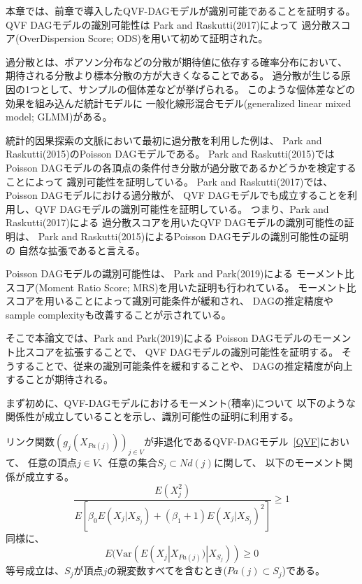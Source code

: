 

本章では、前章で導入したQVF-DAGモデル\cite{Park2017-hw}が識別可能であることを証明する。
QVF DAGモデルの識別可能性は
Park and Raskutti(2017)\cite{Park2017-hw}によって
過分散スコア(OverDispersion Score; ODS)を用いて初めて証明された。

過分散とは、ポアソン分布などの分散が期待値に依存する確率分布において、
期待される分散より標本分散の方が大きくなることである。
過分散が生じる原因の1つとして、サンプルの個体差などが挙げられる。
このような個体差などの効果を組み込んだ統計モデルに
一般化線形混合モデル(generalized linear mixed model; GLMM)がある\cite{2012-iq}。

統計的因果探索の文脈において最初に過分散を利用した例は、
Park and Raskutti(2015)\cite{Park2015-tj}のPoisson DAGモデルである。
Park and Raskutti(2015)\cite{Park2015-tj}では
Poisson DAGモデルの各頂点の条件付き分散が過分散であるかどうかを検定することによって
識別可能性を証明している。
Park and Raskutti(2017)\cite{Park2017-hw}では、
Poisson DAGモデルにおける過分散が、
QVF DAGモデルでも成立することを利用し、QVF DAGモデルの識別可能性を証明している。
つまり、Park and Raskutti(2017)\cite{Park2017-hw}による
過分散スコアを用いたQVF DAGモデルの識別可能性の証明は、
Park and Raskutti(2015)\cite{Park2015-tj}によるPoisson DAGモデルの識別可能性の証明の
自然な拡張であると言える。

Poisson DAGモデルの識別可能性は、
Park and Park(2019)\cite{Park2019-qy}による
モーメント比スコア(Moment Ratio Score; MRS)を用いた証明も行われている。
モーメント比スコアを用いることによって識別可能条件が緩和され、
DAGの推定精度やsample complexityも改善することが示されている\cite{Park2019-qy}。

そこで本論文では、Park and Park(2019)\cite{Park2019-qy}による
Poisson DAGモデルのモーメント比スコアを拡張することで、
QVF DAGモデルの識別可能性を証明する。
そうすることで、従来の識別可能条件\cite{Park2017-hw}を緩和することや、
DAGの推定精度が向上することが期待される。

まず初めに、QVF-DAGモデルにおけるモーメント(積率)について
以下のような関係性が成立していることを示し、識別可能性の証明に利用する。

\begin{prop} \label{prop:MRS}
  リンク関数$(g_j(X_{Pa(j)}))_{j \in V}$が非退化であるQVF-DAGモデル~\eqref{QVF}において、
  任意の頂点$j \in V$、任意の集合$S_j \subset \mathit{Nd}(j)$に関して、
  以下のモーメント関係が成立する。
  \begin{equation}
    \frac{E(X_j^2)}
    {E \left[ \beta_0 E(X_j | X_{S_j}) + (\beta_1 + 1)E(X_j | X_{S_j})^2 \right]}
    \geq 1
    \label{eq:MRS}
  \end{equation}
  同様に、
  \begin{equation}
    \label{eq:MRS_2}
    E(\mathrm{Var}( E(X_j | X_{Pa(j)}) | X_{S_j} )) \geq 0
  \end{equation}
  等号成立は、$S_j$が頂点$j$の親変数すべてを含むとき($Pa(j)\subset S_j$)である。
\end{prop}

